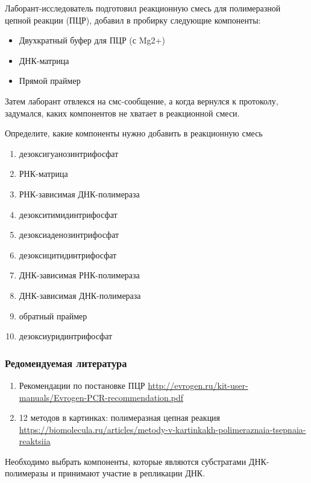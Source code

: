 
Лаборант-исследователь подготовил реакционную смесь для полимеразной цепной реакции (ПЦР), добавил в пробирку следующие компоненты: 

\begin{itemize}
    \item Двухкратный буфер для ПЦР (с Mg2+)
    \item ДНК-матрица
    \item Прямой праймер
\end{itemize}

Затем лаборант отвлекся на смс-сообщение, а когда вернулся к протоколу, задумался, каких компонентов не хватает в реакционной смеси.

Определите, какие компоненты нужно добавить в реакционную смесь

\begin{enumerate}
    \item дезоксигуанозинтрифосфат
    \item РНК-матрица
    \item РНК-зависимая ДНК-полимераза
    \item дезокситимидинтрифосфат
    \item дезоксиаденозинтрифосфат
    \item дезоксицитидинтрифосфат
    \item ДНК-зависимая РНК-полимераза
    \item ДНК-зависимая ДНК-полимераза
    \item обратный праймер
    \item дезоксиуридинтрифосфат
\end{enumerate}

\subsubsection*{Редомендуемая литература}

\begin{enumerate}
    \item Рекомендации по постановке ПЦР \url{http://evrogen.ru/kit-user-manuals/Evrogen-PCR-recommendation.pdf}
    \item 12 методов в картинках: полимеразная цепная реакция \url{https://biomolecula.ru/articles/metody-v-kartinkakh-polimeraznaia-tsepnaia-reaktsiia}
\end{enumerate}

\explanationSection

Необходимо выбрать компоненты, которые являются субстратами ДНК-полимеразы и принимают участие в репликации ДНК.

